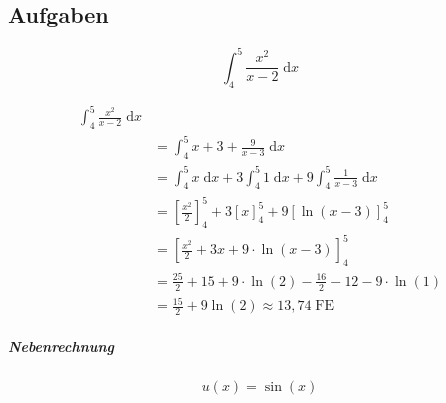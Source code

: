 \subsection{Aufgaben}

\begin{uebung}
	\begin{question}
		\[
			\int_4^5 \frac{x^2}{x-2} \;\mathrm{d}x
		\]
	\end{question}

	\begin{solution}
		\begin{align*}
			\int_4^5 \frac{x^2}{x-2} \;\mathrm{d}x                                                              \\
			 & = \int_4^5 x+3 + \frac{9}{x-3} \;\mathrm{d}x                                                     \\
			 & = \int_4^5 x \;\mathrm{d}x + 3 \int_4^5 1 \;\mathrm{d}x + 9 \int_4^5 \frac{1}{x-3} \;\mathrm{d}x \\
			 & = {\left[ \frac{x^2}{2} \right]}_4^5 + 3 {[x]}_4^5 + 9 {[\ln (x-3)]}_4^5                         \\
			 & = {\left[ \frac{x^2}{2} + 3x + 9 \cdot \ln(x-3) \right]}_4^5                                     \\
			 & = \frac{25}{2} + 15 + 9 \cdot \ln(2) - \frac{16}{2} - 12 -9 \cdot \ln(1)                         \\
			 & = \frac{15}{2} + 9 \ln(2) \approx 13,74\;\mathrm{FE}
		\end{align*}


		\subparagraph{Nebenrechnung}

	\end{solution}

	\begin{question}
		\[
			u(x) = \sin(x)
		\]
	\end{question}


\end{uebung}
